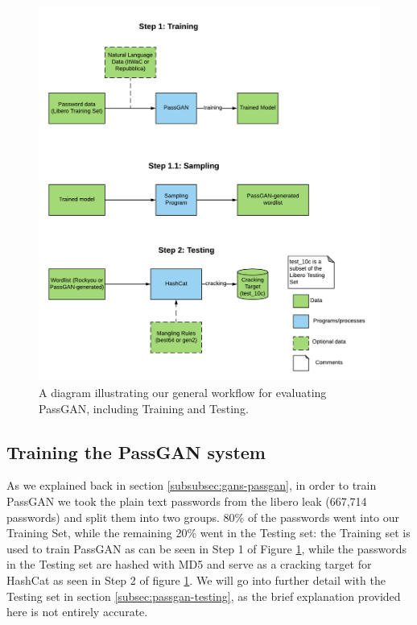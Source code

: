 \begin{figure}[H]
\centering
    \includegraphics[scale=0.7]{figures/testing_flowchart_ocd.png}
    \caption{A diagram illustrating our general workflow for evaluating PassGAN, including Training and Testing.}
    \label{fig:testing_flowchart}
\end{figure}    

\subsection{Training the PassGAN system}\label{subsec:passgan-training}
As we explained back in section \ref{subsubsec:gans-passgan}, in order to train PassGAN we took the plain text passwords from the libero leak (667,714 passwords) and split them into two groups. 80\% of the passwords went into our Training Set, while the remaining 20\% went in the Testing set: the Training set is used to train PassGAN as can be seen in Step 1 of Figure \ref{fig:testing_flowchart}, while the passwords in the Testing set are hashed with MD5 and serve as a cracking target for HashCat as seen in Step 2 of figure \ref{fig:testing_flowchart}. We will go into further detail with the Testing set in section \ref{subsec:passgan-testing}, as the brief explanation provided here is not entirely accurate.

